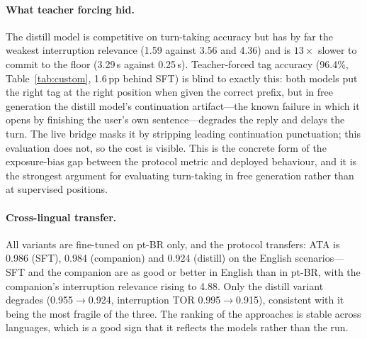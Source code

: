 \documentclass[conference]{IEEEtran}
\begin{document}
\paragraph{What teacher forcing hid.} The distill model is competitive on
turn-taking accuracy but has by far the weakest interruption relevance (1.59
against 3.56 and 4.36) and is $13\times$ slower to commit to the floor (3.29\,s
against 0.25\,s). Teacher-forced tag accuracy (96.4\%, Table~\ref{tab:custom},
1.6\,pp behind SFT) is blind to exactly this: both models put the right tag at the
right position when given the correct prefix, but in free generation the distill
model's continuation artifact---the known failure in which it opens by finishing
the user's own sentence---degrades the reply and delays the turn. The live bridge
masks it by stripping leading continuation punctuation; this evaluation does not,
so the cost is visible. This is the concrete form of the exposure-bias gap
between the protocol metric and deployed behaviour, and it is the strongest
argument for evaluating turn-taking in free generation rather than at supervised
positions.

\paragraph{Cross-lingual transfer.}
\label{sec:results_transfer}
All variants are fine-tuned on pt-BR only, and the protocol transfers: ATA is
0.986 (SFT), 0.984 (companion) and 0.924 (distill) on the English
scenarios---SFT and the companion are as good or better in English than in
pt-BR, with the companion's interruption relevance rising to 4.88. Only the
distill variant degrades (0.955$\rightarrow$0.924, interruption TOR
0.995$\rightarrow$0.915), consistent with it being the most fragile of the three.
The ranking of the approaches is stable across languages, which is a good sign
that it reflects the models rather than the run.
\end{document}
